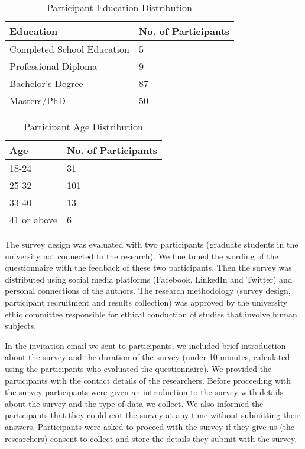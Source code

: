\documentclass[10pt]{article}
\begin{document}
\begin{center}
\begin{table}[htbp]
\caption{Participant Education Distribution}
\begin{center}

\begin{tabular}{|l|l|} 
\hline
Education & No. of Participants \\
\hline
Completed School Education & 5 \\
\hline
Professional Diploma & 9 \\
\hline
Bachelor's Degree & 87 \\
\hline
Masters/PhD & 50 \\
\hline
\end{tabular}
\end{center}
\end{table}
\end{center} 

\begin{center}
\begin{table}[htbp]
\caption{Participant Age Distribution}
\begin{center}
\begin{tabular}{|l|l|} 
\hline
Age & No. of Participants \\
\hline
18-24  & 31 \\
\hline
25-32 & 101 \\
\hline
33-40& 13 \\
\hline
41 or above & 6\\
\hline
\end{tabular}
\end{center}
\end{table}
\end{center} 

The survey design was evaluated with two participants (graduate students in the university not connected to the research). We fine tuned the wording of the questionnaire with the feedback of these two participants. Then the survey was distributed using social media platforms (Facebook, LinkedIn and Twitter) and personal connections of the authors. The research methodology (survey design, participant recruitment and results collection) was approved by the university ethic committee responsible for ethical conduction of studies that involve human subjects. 

In the invitation email we sent to participants, we included brief introduction about the survey and the duration of the survey (under 10 minutes, calculated using the participants who evaluated the questionnaire). We provided the participants with the contact details of the researchers. Before proceeding with the survey participants were given an introduction to the survey with details about the survey and the type of data we collect. We also informed the participants that they could exit the survey at any time without submitting their answers. Participants were asked to proceed with the survey if they give us (the researchers) consent to collect and store the details they submit with the survey.
\end{document}
